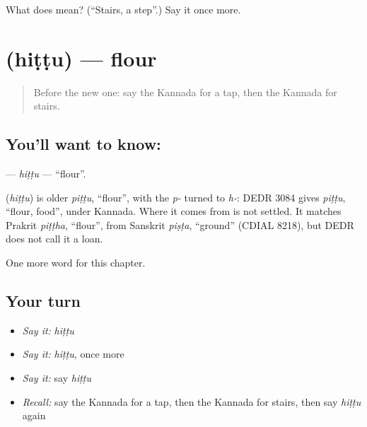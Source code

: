 \begin{tcolorbox}[breakable,colback=teal!4,colframe=teal!35!black,title={Before you move on}]
What does  mean? (\textquotedblleft{}Stairs, a step\textquotedblright{}.) Say it once more.
\end{tcolorbox}
\section[\texorpdfstring{\kn{ಹಿಟ್ಟು} (hiṭṭu)}{ಹಿಟ್ಟು (hiṭṭu)}]{ (hiṭṭu) — flour}

\label{lesson:KA-C257-hittu}



\begin{quote}
Before the new one: say the Kannada for a tap, then the Kannada for stairs.
\end{quote}

\subsection*{You'll want to know: }
\textbf{} — \emph{hiṭṭu} — \textquotedblleft{}flour\textquotedblright{}.

\begin{cousinweb}
\textbf{} (\emph{hiṭṭu}) is older \emph{piṭṭu}, \textquotedblleft{}flour\textquotedblright{}, with the \emph{p-} turned to \emph{h-}: DEDR 3084 gives \emph{piṭṭu}, \textquotedblleft{}flour, food\textquotedblright{}, under Kannada. Where it comes from is not settled. It matches Prakrit \emph{piṭṭha}, \textquotedblleft{}flour\textquotedblright{}, from Sanskrit \emph{piṣṭa}, \textquotedblleft{}ground\textquotedblright{} (CDIAL 8218), but DEDR does not call it a loan.
\end{cousinweb}

\begin{grammarlens}[title={What you've built}]
One more word for this chapter.
\end{grammarlens}

\subsection*{Your turn}
\begin{itemize}
\raggedright
  \item \emph{Say it:} \emph{hiṭṭu}
  \item \emph{Say it:} \emph{hiṭṭu}, once more
  \item \emph{Say it:} say \emph{hiṭṭu}
  \item \emph{Recall:} say the Kannada for a tap, then the Kannada for stairs, then say \emph{hiṭṭu} again
\end{itemize}

